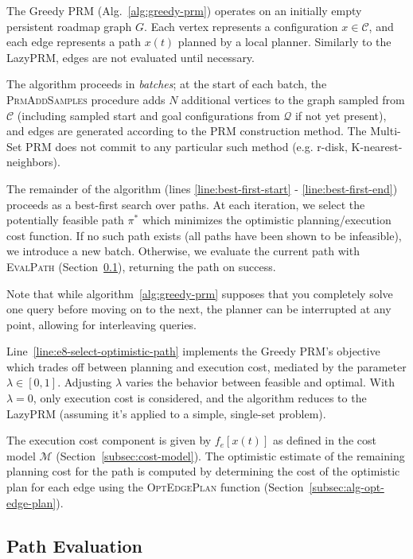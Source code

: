 \documentclass{report}
\begin{document}
The Greedy PRM (Alg.~\ref{alg:greedy-prm})
operates on an initially empty persistent roadmap graph $G$.
Each vertex represents a configuration $x \in \mathcal{C}$,
and each edge represents a path $x(t)$ planned by a local planner.
Similarly to the LazyPRM,
edges are not evaluated until necessary.

The algorithm proceeds in \emph{batches};
at the start of each batch,
the \textsc{PrmAddSamples} procedure adds
$N$ additional vertices to the graph sampled from $\mathcal{C}$
(including sampled start and goal configurations from $\mathcal{Q}$
if not yet present),
and edges are generated according to the PRM construction method.
The Multi-Set PRM does not commit to any particular such method
(e.g. r-disk, K-nearest-neighbors).

The remainder of the algorithm
(lines \ref{line:best-first-start} - \ref{line:best-first-end})
proceeds as a best-first search over paths.
At each iteration,
we select the potentially feasible path $\pi^*$
which minimizes the optimistic
planning/execution cost function.
If no such path exists
(all paths have been shown to be infeasible),
we introduce a new batch.
Otherwise, we evaluate the current path with
\textsc{EvalPath}
(Section~\ref{subsec:alg-path-evaluation}),
returning the path on success.

Note that while
algorithm~\ref{alg:greedy-prm} supposes that you completely solve
one query before moving on to the next,
the planner can be interrupted at any point,
allowing for interleaving queries.

Line~\ref{line:e8-select-optimistic-path}
implements the Greedy PRM's objective
which trades off between planning and execution cost,
mediated by the parameter $\lambda \in [0,1]$.
Adjusting $\lambda$ varies the behavior between feasible and optimal.
With $\lambda = 0$,
only execution cost is considered,
and the algorithm reduces to the LazyPRM
(assuming it's applied to a simple, single-set problem).

The execution cost component is given by $f_e[x(t)]$
as defined in the cost model $\mathcal{M}$
(Section~\ref{subsec:cost-model}).
The optimistic estimate of the remaining planning cost for the path
is computed by determining the cost of the optimistic plan for each
edge using the \textsc{OptEdgePlan} function
(Section~\ref{subsec:alg-opt-edge-plan}).

\subsection{Path Evaluation}
\label{subsec:alg-path-evaluation}
\end{document}
